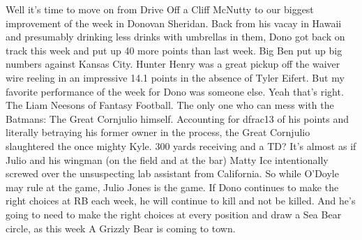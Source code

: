 \documentclass[11pt,letterpaper]{article}
\begin{document}
\bigskip
\par\noindent Well it's time to move on from Drive Off a Cliff McNutty to our biggest improvement of the week in Donovan Sheridan. Back from his vacay in Hawaii and presumably drinking less drinks with umbrellas in them, Dono got back on track this week and put up 40 more points than last week. Big Ben put up big numbers against Kansas City. Hunter Henry was a great pickup off the waiver wire reeling in an impressive 14.1 points in the absence of Tyler Eifert. But my favorite performance of the week for Dono was someone else. Yeah that's right. The Liam Neesons of Fantasy Football. The only one who can mess with the Batmans: The Great Cornjulio himself. Accounting for dfrac{1}{3} of his points and literally betraying his former owner in the process, the Great Cornjulio slaughtered the once mighty Kyle. 300 yards receiving and a TD? It's almost as if Julio and his wingman (on the field and at the bar) Matty Ice intentionally screwed over the unsuspecting lab assistant from California. So while O'Doyle may rule at the game, Julio Jones is the game. If Dono continues to make the right choices at RB each week, he will continue to kill and not be killed. And he's going to need to make the right choices at every position and draw a Sea Bear circle, as this week A Grizzly Bear is coming to town.  
\end{document}

